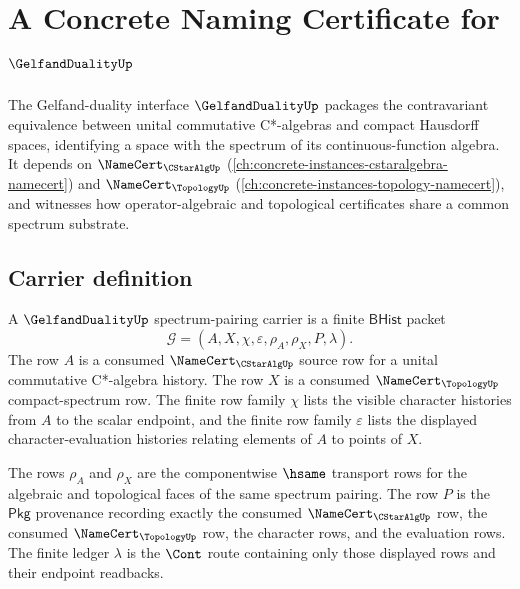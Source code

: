 \chapter{A Concrete Naming Certificate for $\GelfandDualityUp$}
\label{ch:concrete-instances-gelfandduality-namecert}

The Gelfand-duality interface $\GelfandDualityUp$ packages the contravariant equivalence between unital commutative C*-algebras and compact Hausdorff spaces, identifying a space with the spectrum of its continuous-function algebra. It depends on $\NameCert_{\CStarAlgUp}$ (\autoref{ch:concrete-instances-cstaralgebra-namecert}) and $\NameCert_{\TopologyUp}$ (\autoref{ch:concrete-instances-topology-namecert}), and witnesses how operator-algebraic and topological certificates share a common spectrum substrate.

\section{Carrier definition}
\label{sec:gelfandduality-carrier}

\begin{definition}
\label{def:gelfandduality-spectrum-pairing-carrier}
A $\GelfandDualityUp$ spectrum-pairing carrier is a finite $\mathsf{BHist}$
packet
$$
\mathcal{G}=(A,X,\chi,\varepsilon,\rho_{A},\rho_{X},P,\lambda).
$$
The row $A$ is a consumed $\NameCert_{\CStarAlgUp}$ source row for a unital
commutative C*-algebra history. The row $X$ is a consumed
$\NameCert_{\TopologyUp}$ compact-spectrum row. The finite row family $\chi$
lists the visible character histories from $A$ to the scalar endpoint, and
the finite row family $\varepsilon$ lists the displayed character-evaluation
histories relating elements of $A$ to points of $X$.

The rows $\rho_{A}$ and $\rho_{X}$ are the componentwise $\hsame$ transport
rows for the algebraic and topological faces of the same spectrum pairing.
The row $P$ is the $\mathsf{Pkg}$ provenance recording exactly the consumed
$\NameCert_{\CStarAlgUp}$ row, the consumed $\NameCert_{\TopologyUp}$ row,
the character rows, and the evaluation rows. The finite ledger $\lambda$ is
the $\Cont$ route containing only those displayed rows and their endpoint
readbacks.
\end{definition}

